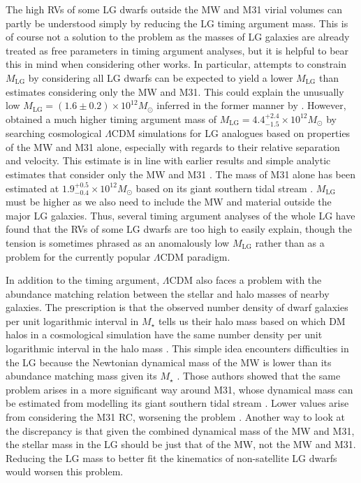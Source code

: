 \documentclass[fleqn,usenatbib,useAMS]{mnras} %
\begin{document}
The high RVs of some LG dwarfs outside the MW and M31 virial volumes can partly be understood simply by reducing the LG timing argument mass. This is of course not a solution to the problem as the masses of LG galaxies are already treated as free parameters in timing argument analyses, but it is helpful to bear this in mind when considering other works. In particular, attempts to constrain $M_\text{LG}$ by considering all LG dwarfs can be expected to yield a lower $M_\text{LG}$ than estimates considering only the MW and M31. This could explain the unusually low $M_\text{LG} = \left( 1.6 \pm 0.2 \right) \times 10^{12} M_\odot$ inferred in the former manner by \citet{Kashibadze_2018}. However, \citet{Zhai_2020} obtained a much higher timing argument mass of $M_\text{LG} = 4.4^{+2.4}_{-1.5} \times 10^{12} M_\odot$ by searching cosmological $\Lambda$CDM simulations for LG analogues based on properties of the MW and M31 alone, especially with regards to their relative separation and velocity. This estimate is in line with earlier results and simple analytic estimates that consider only the MW and M31 \citep{Li_White_2008}. The mass of M31 alone has been estimated at $1.9_{-0.4}^{+0.5} \times 10^{12} M_\odot$ based on its giant southern tidal stream \citep{Fardal_2013}. $M_\text{LG}$ must be higher as we also need to include the MW and material outside the major LG galaxies. Thus, several timing argument analyses of the whole LG have found that the RVs of some LG dwarfs are too high to easily explain, though the tension is sometimes phrased as an anomalously low $M_\text{LG}$ rather than as a problem for the currently popular $\Lambda$CDM paradigm.

In addition to the timing argument, $\Lambda$CDM also faces a problem with the abundance matching relation between the stellar and halo masses of nearby galaxies. The prescription is that the observed number density of dwarf galaxies per unit logarithmic interval in $M_{\star}$ tells us their halo mass based on which DM halos in a cosmological simulation have the same number density per unit logarithmic interval in the halo mass \citep{Behroozi_2013_AM, Moster_2013}. This simple idea encounters difficulties in the LG because the Newtonian dynamical mass of the MW \citep{Wang_2022} is lower than its abundance matching mass given its $M_{\star}$ \citep{McGaugh_Dokkum_2021}. Those authors showed that the same problem arises in a more significant way around M31, whose dynamical mass can be estimated from modelling its giant southern tidal stream \citep{Fardal_2013}. Lower values arise from considering the M31 RC, worsening the problem \citep{Chemin_2009, Kafle_2018}. Another way to look at the discrepancy is that given the combined dynamical mass of the MW and M31, the stellar mass in the LG should be just that of the MW, not the MW and M31. Reducing the LG mass to better fit the kinematics of non-satellite LG dwarfs would worsen this problem.
\end{document}
